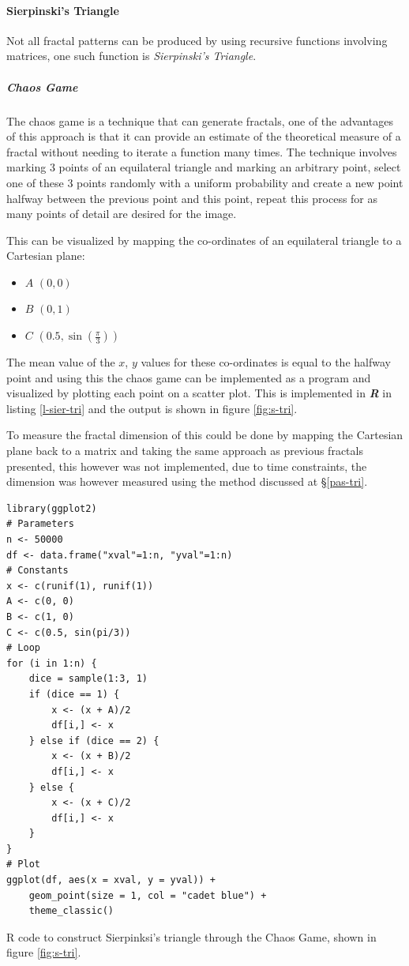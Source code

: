 \documentclass[a4paper,11pt,twoside]{article}
\begin{document}
\paragraph{Sierpinski's Triangle}
\label{sec:org0bada8f}
Not all fractal patterns can be produced by using recursive functions involving matrices, one such function is \emph{Sierpinski's Triangle}.
\subparagraph{Chaos Game}
\label{sec:org1296140}
The chaos game is a technique that can generate fractals, one of the advantages of this approach is that it can provide an estimate of the theoretical measure of a fractal without needing to iterate a function many times. The technique involves marking 3 points of an equilateral triangle and marking an arbitrary point, select one of these 3 points randomly with a uniform probability and create a new point halfway between the previous point and this point, repeat this process for as many points of detail are desired for the image.

This can be visualized by mapping the co-ordinates of an equilateral triangle to a Cartesian plane:

\begin{itemize}
\item \(A\)  \(\left(0, 0\right)\)
\item \(B\)  \(\left(0, 1\right)\)
\item \(C\)  \(\left(0.5, \sin\left(\frac{\pi}{3}\right)\right)\)
\end{itemize}

The mean value of the \(x\), \(y\) values for these co-ordinates is equal to the
halfway point and using this the chaos game can be implemented as a program and
visualized by plotting each point on a scatter plot. This is implemented in
\emph{\textbf{R}} in listing \ref{l-sier-tri} and the output is shown in figure \ref{fig:s-tri}.

To measure the fractal dimension of this could be done by mapping the Cartesian
plane back to a matrix and taking the same approach as previous fractals
presented, this however was not implemented, due to time constraints, the
dimension was however measured using the method discussed at \S \ref{pas-tri}.

\begin{listing}[htbp]
\begin{verbatim}
library(ggplot2)
# Parameters
n <- 50000
df <- data.frame("xval"=1:n, "yval"=1:n)
# Constants
x <- c(runif(1), runif(1))
A <- c(0, 0)
B <- c(1, 0)
C <- c(0.5, sin(pi/3))
# Loop
for (i in 1:n) {
    dice = sample(1:3, 1)
    if (dice == 1) {
        x <- (x + A)/2
        df[i,] <- x
    } else if (dice == 2) {
        x <- (x + B)/2
        df[i,] <- x
    } else {
        x <- (x + C)/2
        df[i,] <- x
    }
}
# Plot
ggplot(df, aes(x = xval, y = yval)) +
    geom_point(size = 1, col = "cadet blue") +
    theme_classic()

\end{verbatim}
\caption{\label{l-sier-tri}R code to construct Sierpinksi's triangle through the Chaos Game, shown in figure \ref{fig:s-tri}.}
\end{listing}
\end{document}
